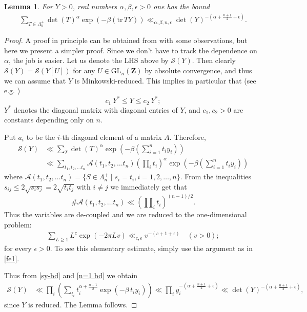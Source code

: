 \documentclass[12pt]{amsart}
\numberwithin{equation}{section}
\theoremstyle{plain}
\newtheorem{lem}[thm]{Lemma}
\theoremstyle{definition}
\newcommand{\mf}{\mathbf}
\newcommand{\q}{\quad}
\newcommand{\mc}{\mathcal}
\newcommand{\mrm}{\mathrm}
\newcommand{\glnz}{\mrm{GL}_n( \mf Z)}
\newcommand{\tr}{\mathrm{tr}\,}
\newcommand{\sumn}{\sum \nolimits}
\begin{document}
    

\begin{lem} \label{lipschitz-lem}
    For $Y>0$, real numbers $\alpha, \beta, \epsilon >0$ one has the bound
    \begin{align}
        \sumn_{T \in \Lambda_n^+} \det(T)^\alpha \exp(- \beta (\tr T Y)) \ll_{\alpha, \beta, n, \epsilon} \det(Y)^{- (\alpha + \frac{n+1}{2} +\epsilon) }.
    \end{align}
\end{lem}

\begin{proof}
    A proof in principle can be obtained from \cite[Proposition~3.7 or Lemma ~6.2]{das-krishna} with some observations, but here we present a simpler proof. Since we don't have to track the dependence on $\alpha$, the job is easier. Let us denote the LHS above by $\mc S(Y)$. Then clearly $\mc S(Y) = \mc S(Y[U])$ for any $U \in \glnz$ by absolute convergence, and thus we can assume that $Y$ is Minkowski-reduced. This implies in particular that (see e.g. \cite[p~.20]{klingen1}) 
    \[ c_1 \ Y^* \le Y \le c_2 \ Y^*; \]
$Y^*$ denotes the diagonal matrix with diagonal entries of $Y$, and $c_1,c_2>0$ are constants depending only on $n$.

    
    Put $a_i$ to be the $i$-th diagonal element of a matrix $A$. Therefore,
    \begin{align}
        \mc S(Y) & \ll \sumn_{T} \det(T)^\alpha \exp(- \beta (\sumn_{i=1}^n t_i y_i)) \\
        & \ll \sumn_{t_1,t_2,\ldots t_n} \mc A(t_1,t_2,\ldots t_n) (\prod\nolimits_i t_i)^\alpha \exp(- \beta (\sumn_{i=1}^n t_i y_i)) \label{sy-bd}
    \end{align}
where $\displaystyle \mc A(t_1,t_2,\ldots t_n) = \{ S \in \Lambda_n^+ \mid s_i=t_i, i=1,2,\ldots,n\}$. From the inequalities $s_{ij} \le 2 \sqrt{s_i s_j}=2 \sqrt{t_i t_j}$ with $i \neq j$ we immediately get that 
\[\# \mc A(t_1,t_2,\ldots t_n) \ll (\prod\nolimits_i t_i)^{(n-1)/2}.\] Thus the variables are de-coupled and we are reduced to the one-dimensional problem:
\begin{align} \label{n=1 bd}
     \sumn_{L \ge 1} L^c \exp(- 2 \pi L v) \ll_{c,\epsilon} v^{-(c+1+\epsilon)} \q (v >0);
\end{align}
for every $\epsilon>0$. To see this elementary estimate, simply use the argument as in \eqref{fe1}.

Thus from \eqref{sy-bd} and \eqref{n=1 bd} we obtain
\begin{align}
     \mc S(Y) & \ll \prod \nolimits_i \left( \sumn_{t_i}  t_i^{ \alpha+\frac{n-1}{2} } \exp(- \beta \, t_i y_i) \right)  \ll  \prod\nolimits_i y_i^{-( \alpha+\frac{n+1}{2} +\epsilon)} \ll \det(Y)^{-( \alpha+\frac{n+1}{2} +\epsilon)},
\end{align}
since $Y$ is reduced. The Lemma follows.
\end{proof}
\end{document}
